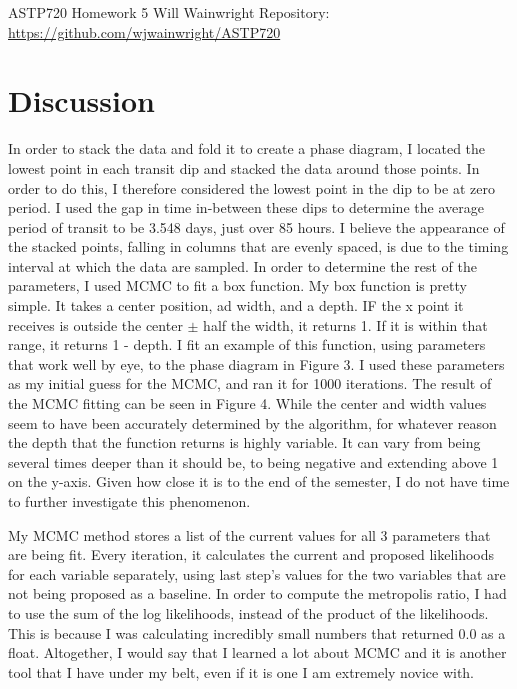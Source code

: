\documentclass[twocolumn,11pt]{article}
\begin{document}
\pagestyle{plain}
\onecolumn
ASTP720 
\newline Homework 5
\newline Will Wainwright
\newline Repository: \href{https://github.com/wjwainwright/ASTP720}{https://github.com/wjwainwright/ASTP720}

\section*{Discussion}
In order to stack the data and fold it to create a phase diagram, I located the lowest point in each transit dip and stacked the data around those points. In order to do this, I therefore considered the lowest point in the dip to be at zero period. I used the gap in time in-between these dips to determine the average period of transit to be 3.548 days, just over 85 hours. I believe the appearance of the stacked points, falling in columns that are evenly spaced, is due to the timing interval at which the data are sampled. In order to determine the rest of the parameters, I used MCMC to fit a box function. My box function is pretty simple. It takes a center position, ad width, and a depth. IF the x point it receives is outside the center $\pm$ half the width, it returns 1. If it is within that range, it returns 1 - depth. I fit an example of this function, using parameters that work well by eye, to the phase diagram in Figure 3. I used these parameters as my initial guess for the MCMC, and ran it for 1000 iterations. The result of the MCMC fitting can be seen in Figure 4. While the center and width values seem to have been accurately determined by the algorithm, for whatever reason the depth that the function returns is highly variable. It can vary from being several times deeper than it should be, to being negative and extending above 1 on the y-axis. Given how close it is to the end of the semester, I do not have time to further investigate this phenomenon. 

My MCMC method stores a list of the current values for all 3 parameters that are being fit. Every iteration, it calculates the current and proposed likelihoods for each variable separately, using last step's values for the two variables that are not being proposed as a baseline. In order to compute the metropolis ratio, I had to use the sum of the log likelihoods, instead of the product of the likelihoods. This is because I was calculating incredibly small numbers that returned 0.0 as a float. Altogether, I would say that I learned a lot about MCMC and it is another tool that I have under my belt, even if it is one I am extremely novice with.
\end{document}
